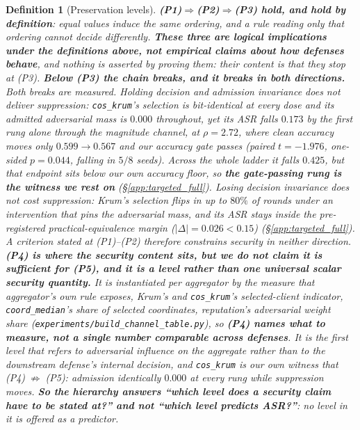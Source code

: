 \documentclass{article}
\newtheorem{definition}{Definition}
\begin{document}
\begin{definition}[Preservation levels]
\textbf{(P1)$\Rightarrow$(P2)$\Rightarrow$(P3) hold, and hold by definition}: equal values induce the same ordering, and a rule reading only that ordering cannot decide differently. \textbf{These three are logical implications under the definitions above, not empirical claims about how defenses behave}, and nothing is asserted by proving them: their content is that they stop at (P3). \textbf{Below (P3) the chain breaks, and it breaks in both directions.} Both breaks are measured. \emph{Holding} decision \emph{and} admission invariance does not deliver suppression: \texttt{cos\_krum}'s selection is bit-identical at every dose and its admitted adversarial mass is $0.000$ throughout, yet its ASR falls $0.173$ by the first rung alone through the magnitude channel, at $\rho{=}2.72$, where clean accuracy moves only $0.599 \to 0.567$ and our accuracy gate passes (paired $t{=}{-}1.976$, one-sided $p{=}0.044$, falling in $5/8$ seeds). Across the whole ladder it falls $0.425$, but that endpoint sits below our own accuracy floor, so \textbf{the gate-passing rung is the witness we rest on} (§\ref{app:targeted_full}). \emph{Losing} decision invariance does not cost suppression: Krum's selection flips in up to $80\%$ of rounds under an intervention that pins the adversarial mass, and its ASR stays inside the pre-registered practical-equivalence margin ($|\Delta|{=}0.026 < 0.15$) (§\ref{app:targeted_full}). A criterion stated at (P1)--(P2) therefore constrains security in \emph{neither} direction. \textbf{(P4) is where the security content sits, but we do not claim it is sufficient for (P5), and it is a \emph{level} rather than one universal scalar security quantity.} It is instantiated per aggregator by the measure that aggregator's own rule exposes, Krum's and \texttt{cos\_krum}'s selected-client indicator, \texttt{coord\_median}'s share of selected coordinates, reputation's adversarial weight share (\texttt{experiments/build\_channel\_table.py}), so \textbf{(P4) names what to measure, not a single number comparable across defenses}. It is the first level that refers to \emph{adversarial influence on the aggregate} rather than to the downstream defense's internal decision, and \texttt{cos\_krum} is our own witness that (P4)$\;\not\Rightarrow\;$(P5): admission identically $0.000$ at every rung while suppression moves. \textbf{So the hierarchy answers ``which level does a security claim have to be stated at?'' and not ``which level predicts ASR?''}: no level in it is offered as a predictor.
\end{definition}
\end{document}
